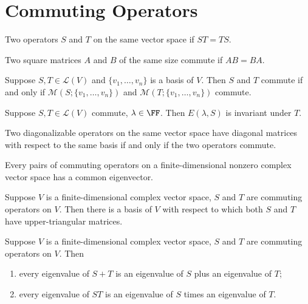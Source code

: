 \section{Commuting Operators}
\begin{definition}[Commute]
Two operators $S$ and $T$ on the same vector space  if $ST=TS$.

Two square matrices $A$ and $B$ of the same size commute if $AB=BA$.
\end{definition}

\begin{lemma}
Suppose $S,T\in\mathcal{L}(V)$ and $\{v_1,\dots,v_n\}$ is a basis of $V$. Then $S$ and $T$ commute if and only if $\mathcal{M}(S;\{v_1,\dots,v_n\})$ and $\mathcal{M}(T;\{v_1,\dots,v_n\})$ commute.
\end{lemma}

\begin{lemma}
Suppose $S,T\in\mathcal{L}(V)$ commute, $\lambda\in\FF$. Then $E(\lambda,S)$ is invariant under $T$.
\end{lemma}

\begin{proposition}
Two diagonalizable operators on the same vector space have diagonal matrices with respect to the same basis if and only if the two operators commute.
\end{proposition}

\begin{lemma}
Every pairs of commuting operators on a finite-dimensional nonzero complex vector space has a common eigenvector.
\end{lemma}

\begin{lemma}
Suppose $V$ is a finite-dimensional complex vector space, $S$ and $T$ are commuting operators on $V$. Then there is a basis of $V$ with respect to which both $S$ and $T$ have upper-triangular matrices.
\end{lemma}

\begin{proposition}
Suppose $V$ is a finite-dimensional complex vector space, $S$ and $T$ are commuting operators on $V$. Then
\begin{enumerate}[label=(\roman*)]
\item every eigenvalue of $S+T$ is an eigenvalue of $S$ plus an eigenvalue of $T$;
\item every eigenvalue of $ST$ is an eigenvalue of $S$ times an eigenvalue of $T$.
\end{enumerate}
\end{proposition}
\pagebreak

